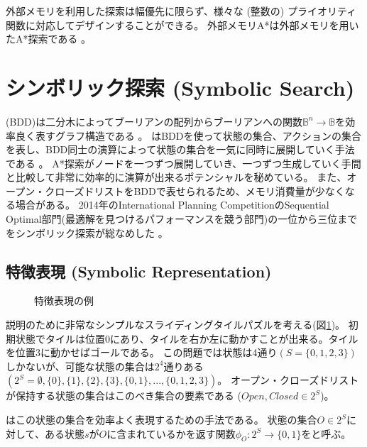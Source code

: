 外部メモリを利用した探索は幅優先に限らず、様々な (整数の) プライオリティ関数に対応してデザインすることができる。
外部メモリA*は外部メモリを用いたA*探索である \cite{edelkamp2004external}。


\section{シンボリック探索 (Symbolic Search)}
\label{sec:symbolic-search}
 (BDD)は二分木によってブーリアンの配列からブーリアンへの関数$\mathbb{B}^n \rightarrow \mathbb{B}$を効率良く表すグラフ構造である \cite{akers1978binary,bryant1992symbolic}。
はBDDを使って状態の集合、アクションの集合を表し、BDD同士の演算によって状態の集合を一気に同時に展開していく手法である \cite{edelkamp1998obdds,Edelkamp99deterministicstate}。
A*探索がノードを一つずつ展開していき、一つずつ生成していく手間と比較して非常に効率的に演算が出来るポテンシャルを秘めている。
また、オープン・クローズドリストをBDDで表せられるため、メモリ消費量が少なくなる場合がある。
2014年のInternational Planning CompetitionのSequential Optimal部門(最適解を見つけるパフォーマンスを競う部門)の一位から三位までをシンボリック探索が総なめした \cite{vallati20152014}。


\subsection{特徴表現 (Symbolic Representation)}
\label{sec:symbolic-representation}



\begin{figure}
  \centering
  \begin{tikzpicture}[scale=0.6]
    
  \end{tikzpicture}
\caption{特徴表現の例}
\label{fig:sliding-token}
\end{figure}


説明のために非常なシンプルなスライディングタイルパズルを考える(図\ref{fig:sliding-token})。
初期状態でタイルは位置0にあり、タイルを右か左に動かすことが出来る。タイルを位置3に動かせばゴールである。
この問題では状態は4通り$(S = \{0,1,2,3\})$しかないが、可能な状態の集合は$2^4$通りある $(2^S = \emptyset, \{0\}, \{1\}, \{2\}, \{3\}, \{0, 1\}, ..., \{0, 1, 2, 3\})$。
オープン・クローズドリストが保持する状態の集合はこのべき集合の要素である ($Open, Closed \in 2^S$)。

はこの状態の集合を効率よく表現するための手法である。
状態の集合$O \in 2^S$に対して、ある状態$s$が$O$に含まれているかを返す関数$\phi_{O}: 2^S \rightarrow \{0, 1\}$をと呼ぶ。

